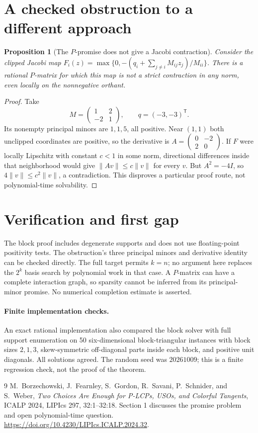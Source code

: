 \documentclass[11pt]{article}
\newtheorem{proposition}[theorem]{Proposition}
\theoremstyle{definition}
\begin{document}
\section{A checked obstruction to a different approach}
\begin{proposition}[The $P$-promise does not give a Jacobi contraction]
Consider the clipped Jacobi map
$F_i(z)=\max\{0,-(q_i+\sum_{j\ne i}M_{ij}z_j)/M_{ii}\}$.
There is a rational $P$-matrix for which this map is not a strict contraction
in any norm, even locally on the nonnegative orthant.
\end{proposition}
\begin{proof}
Take
\[
 M=\begin{pmatrix}1&2\\-2&1\end{pmatrix},\qquad q=(-3,-3)^{\mathsf T}.
\]
Its nonempty principal minors are $1,1,5$, all positive. Near $(1,1)$ both
unclipped coordinates are positive, so the derivative is
$A=\left(\begin{smallmatrix}0&-2\\2&0\end{smallmatrix}\right)$.
If $F$ were locally Lipschitz with constant $c<1$ in some norm, directional
differences inside that neighborhood would give $\|Av\|\leq c\|v\|$ for
every $v$. But $A^2=-4I$, so $4\|v\|\leq c^2\|v\|$, a contradiction.
This disproves a particular proof route, not polynomial-time solvability.
\end{proof}

\section{Verification and first gap}
The block proof includes degenerate supports and does not use floating-point
positivity tests. The obstruction's three principal minors and derivative
identity can be checked directly. The full target permits $k=n$; no argument
here replaces the $2^k$ basis search by polynomial work in that case. A
$P$-matrix can have a complete interaction graph, so sparsity cannot be inferred
from its principal-minor promise. No numerical completion estimate is asserted.

\paragraph{Finite implementation checks.}
An exact rational implementation also compared the block solver with full
support enumeration on 50 six-dimensional block-triangular instances with
block sizes $2,1,3$, skew-symmetric off-diagonal parts inside each block,
and positive unit diagonals. All solutions agreed. The random seed was
$20261009$; this is a finite regression check, not the proof of the theorem.

\begin{thebibliography}{9}
 M.~Borzechowski, J.~Fearnley, S.~Gordon, R.~Savani,
P.~Schnider, and S.~Weber, \emph{Two Choices Are Enough for P-LCPs, USOs,
and Colorful Tangents}, ICALP 2024, LIPIcs 297, 32:1--32:18.
Section 1 discusses the promise problem and open polynomial-time question.
\url{https://doi.org/10.4230/LIPIcs.ICALP.2024.32}.
\end{thebibliography}
\end{document}
